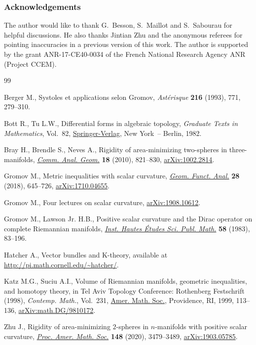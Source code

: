 \documentclass[pdftex]{sigma}
\numberwithin{equation}{section}
\begin{document}
\subsubsection*{Acknowledgements}

The author would like to thank G.~Besson, S.~Maillot and S.~Sabourau for helpful discussions. He also thanks Jintian Zhu and the anonymous referees for pointing inaccuracies in a previous version of this work. The author is supported by the grant ANR-17-CE40-0034 of the French National Research Agency ANR (Project CCEM).

\begin{thebibliography}{99}
\footnotesize\itemsep=0pt

Berger M., Systoles et applications selon {G}romov, \textit{Ast\'erisque}
 \textbf{216} (1993), 771, 279--310.

Bott R., Tu L.W., Differential forms in algebraic topology, \textit{Graduate
 Texts in Mathematics}, Vol.~82, \href{https://doi.org/10.1007/978-1-4757-3951-0}{Springer-Verlag}, New York~-- Berlin, 1982.

Bray H., Brendle S., Neves A., Rigidity of area-minimizing two-spheres in
 three-manifolds, \href{https://doi.org/10.4310/CAG.2010.v18.n4.a6}{\textit{Comm. Anal. Geom.}} \textbf{18} (2010), 821--830,
 \href{https://arxiv.org/abs/1002.2814}{arXiv:1002.2814}.

Gromov M., Metric inequalities with scalar curvature, \href{https://doi.org/10.1007/s00039-018-0453-z}{\textit{Geom. Funct.
 Anal.}} \textbf{28} (2018), 645--726, \href{https://arxiv.org/abs/1710.04655}{arXiv:1710.04655}.

Gromov M., Four lectures on scalar curvature, \href{https://arxiv.org/abs/1908.10612}{arXiv:1908.10612}.

Gromov M., Lawson Jr. H.B., Positive scalar curvature and the {D}irac operator
 on complete {R}iemannian manifolds, \href{https://doi.org/10.1007/BF02953774}{\textit{Inst. Hautes \'Etudes Sci. Publ.
 Math.}} \textbf{58} (1983), 83--196.

Hatcher A., Vector bundles and K-theory, available at
 \url{http://pi.math.cornell.edu/~hatcher/}.

Katz M.G., Suciu A.I., Volume of {R}iemannian manifolds, geometric
 inequalities, and homotopy theory, in Tel {A}viv {T}opology {C}onference:
 {R}othenberg {F}estschrift (1998), \textit{Contemp. Math.}, Vol.~231, \href{https://doi.org/10.1090/conm/231/03357}{Amer.
 Math. Soc.}, Providence, RI, 1999, 113--136, \href{https://arxiv.org/abs/math.DG/9810172}{arXiv:math.DG/9810172}.

Zhu J., Rigidity of area-minimizing {$2$}-spheres in {$n$}-manifolds with
 positive scalar curvature, \href{https://doi.org/10.1090/proc/15033}{\textit{Proc. Amer. Math. Soc.}} \textbf{148}
 (2020), 3479--3489, \href{https://arxiv.org/abs/1903.05785}{arXiv:1903.05785}.

\end{thebibliography}\LastPageEnding
\end{document}
